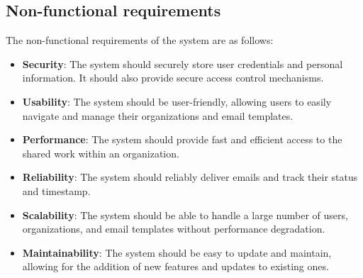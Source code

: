 \subsection{Non-functional requirements}
The non-functional requirements of the system are as follows:
\begin{itemize}
\item \textbf{Security}: The system should securely store user credentials and personal information. It should also provide secure access control mechanisms.
\item \textbf{Usability}: The system should be user-friendly, allowing users to easily navigate and manage their organizations and email templates.
\item \textbf{Performance}: The system should provide fast and efficient access to the shared work within an organization.
\item \textbf{Reliability}: The system should reliably deliver emails and track their status and timestamp.
\item \textbf{Scalability}: The system should be able to handle a large number of users, organizations, and email templates without performance degradation.
\item \textbf{Maintainability}: The system should be easy to update and maintain, allowing for the addition of new features and updates to existing ones.
\end{itemize}

